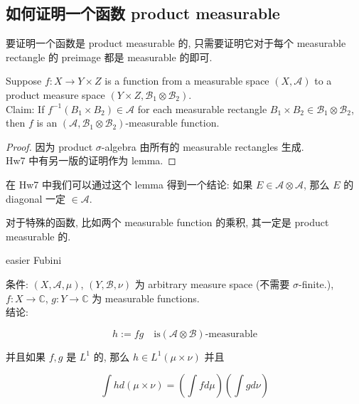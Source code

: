 \documentclass{qlnotes-export}
\begin{document}
\subsection{如何证明一个函数 product measurable}\label{ux5982ux4f55ux8bc1ux660eux4e00ux4e2aux51fdux6570-product-measurable}

要证明一个函数是 product measurable 的, 只需要证明它对于每个 measurable rectangle 的 preimage 都是 measurable 的即可.

\begin{lemma}\label{lem-06-product-measure-fubini-tonelli-lemma-001}

Suppose \(f:X\rightarrow Y \times Z\) is a function from a measurable space \((X,\mathcal{A})\) to a product measure space \((Y \times Z,\mathcal{B}_{1} \otimes \mathcal{B}_{2})\).\\
Claim: If \(f^{- 1}(B_{1} \times B_{2}) \in \mathcal{A}\) for each measurable rectangle \(B_{1} \times B_{2} \in \mathcal{B}_{1} \otimes \mathcal{B}_{2}\), then \(f\) is an \((\mathcal{A},\mathcal{B}_{1} \otimes \mathcal{B}_{2})\)-measurable function.

\end{lemma}

\begin{proof}

因为 product \(\sigma\)-algebra 由所有的 measurable rectangles 生成.\\
Hw7 中有另一版的证明作为 lemma.

\end{proof}

在 Hw7 中我们可以通过这个 lemma 得到一个结论: 如果 \(E \in \mathcal{A} \otimes \mathcal{A}\), 那么 \(E\) 的 diagonal 一定 \(\in \mathcal{A}\).

对于特殊的函数, 比如两个 measurable function 的乘积, 其一定是 product measurable 的.

\begin{lemma}{easier Fubini}\label{lem-06-product-measure-fubini-tonelli-easier-fubini}

条件: \((X,\mathcal{A},\mu)\), \((Y,\mathcal{B},\nu)\) 为 arbitrary measure space (不需要 \(\sigma\)-finite.), \(f:X\rightarrow{\mathbb{C}}\), \(g:Y\rightarrow{\mathbb{C}}\) 为 measurable functions.\\
结论:

\[h := fg\quad\text{is}(\mathcal{A} \otimes \mathcal{B})\text{-measurable}\]

并且如果 \(f,g\) 是 \(L^{1}\) 的, 那么 \(h \in L^{1}(\mu \times \nu)\) 并且

\[\int h d(\mu \times \nu) = (\int f d\mu)(\int g d\nu)\]

\end{lemma}
\end{document}
